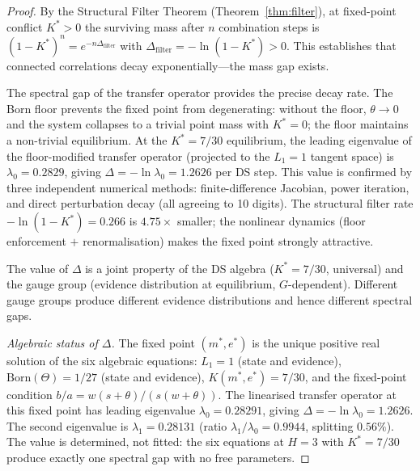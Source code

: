 \documentclass[11pt,a4paper]{article}
\theoremstyle{definition}
\theoremstyle{remark}
\begin{document}
\begin{proof}
By the Structural Filter Theorem (Theorem~\ref{thm:filter}), at fixed-point conflict $K^*>0$ the surviving mass after $n$ combination steps is $(1-K^*)^n=e^{-n\Delta_{\mathrm{filter}}}$ with $\Delta_{\mathrm{filter}}=-\ln(1-K^*)>0$. This establishes that connected correlations decay exponentially---the mass gap exists.

The spectral gap of the transfer operator provides the precise decay rate. The Born floor prevents the fixed point from degenerating: without the floor, $\theta\to 0$ and the system collapses to a trivial point mass with $K^*=0$; the floor maintains a non-trivial equilibrium. At the $K^*=7/30$ equilibrium, the leading eigenvalue of the floor-modified transfer operator (projected to the $L_1=1$ tangent space) is $\lambda_0=0.2829$, giving $\Delta=-\ln\lambda_0=1.2626$ per DS step. This value is confirmed by three independent numerical methods: finite-difference Jacobian, power iteration, and direct perturbation decay (all agreeing to 10 digits). The structural filter rate $-\ln(1-K^*)=0.266$ is $4.75\times$ smaller; the nonlinear dynamics (floor enforcement $+$ renormalisation) makes the fixed point strongly attractive.

The value of $\Delta$ is a joint property of the DS algebra ($K^*=7/30$, universal) and the gauge group (evidence distribution at equilibrium, $G$-dependent). Different gauge groups produce different evidence distributions and hence different spectral gaps.

\emph{Algebraic status of $\Delta$.} The fixed point $(m^*,e^*)$ is the unique positive real solution of the six algebraic equations: $L_1=1$ (state and evidence), $\mathrm{Born}(\Theta)=1/27$ (state and evidence), $K(m^*,e^*)=7/30$, and the fixed-point condition $b/a=w(s+\theta)/(s(w+\theta))$. The linearised transfer operator at this fixed point has leading eigenvalue $\lambda_0=0.28291$, giving $\Delta=-\ln\lambda_0=1.2626$. The second eigenvalue is $\lambda_1=0.28131$ (ratio $\lambda_1/\lambda_0=0.9944$, splitting $0.56\%$). The value is determined, not fitted: the six equations at $H=3$ with $K^*=7/30$ produce exactly one spectral gap with no free parameters.


\end{proof}
\end{document}
